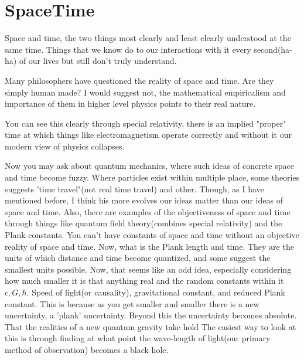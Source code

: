 \section{SpaceTime}
\par Space and time, the two things most clearly and least clearly understood at the same time. Things that we know do to our interactions with it every second(ha-ha) of our lives but still don't truly understand.
\par Many philosophers have questioned the reality of space and time. Are they simply human made? I would suggest not, the mathematical empiricalism and importance of them in higher level physics points to their real nature.
\par You can see this clearly through special relativity, there is an implied "proper" time at which things like electromagnetism operate correctly and without it our modern view of physics collapses.
\par Now you may ask about quantum mechanics, where such ideas of concrete space and time become fuzzy. Where particles exist within multiple place, some theories suggests 'time travel"(not real time travel) and other. Though, as I have mentioned before, I think his more evolves our ideas matter than our ideas of space and time. Also, there are examples of the objectiveness of space and time through things like quantum field theory(combines special relativity) and the Plank constants. You can't have constants of space and time without an objective reality of space and time. Now, what is the Plank length and time. They are the units of which distance and time become quantized, and some suggest the smallest units possible. Now, that seems like an odd idea, especially considering how much smaller it is that anything real and the random constants within it $c,G,\hbar$. Speed of light(or causality), gravitational constant, and reduced Plank constant. This is because as you get smaller and smaller there is a new uncertainty, a 'plank' uncertainty. Beyond this the uncertainty becomes absolute. That the realities of a new quantum gravity take hold The easiest way to look at this is through finding at what point the wave-length of light(our primary method of observation) becomes a black hole.
